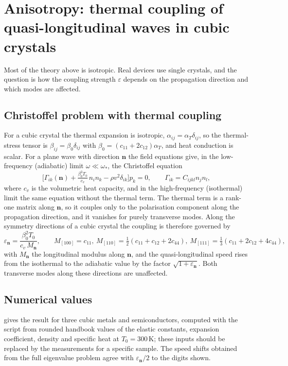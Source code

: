\section{Anisotropy: thermal coupling of quasi-longitudinal waves in cubic crystals}\label{sec:aniso}

Most of the theory above is isotropic. Real devices use single crystals, and the question is how the coupling strength $\varepsilon$ depends on the propagation direction and which modes are affected.

\subsection{Christoffel problem with thermal coupling}
For a cubic crystal the thermal expansion is isotropic, $\alpha_{ij}=\alpha_T\delta_{ij}$, so the thermal-stress tensor is $\beta_{ij}=\beta_0\delta_{ij}$ with $\beta_0=(c_{11}+2c_{12})\alpha_T$, and heat conduction is scalar. For a plane wave with direction $\bm n$ the field equations give, in the low-frequency (adiabatic) limit $\omega\ll\omega_*$, the Christoffel equation
\begin{equation}\label{eq:christ}
\bigl[\Gamma_{ik}(\bm n)+\tfrac{\beta_0^2T_0}{c_v}\,n_in_k-\rho v^2\delta_{ik}\bigr]p_k=0,\qquad \Gamma_{ik}=C_{ijkl}n_jn_l,
\end{equation}
where $c_v$ is the volumetric heat capacity, and in the high-frequency (isothermal) limit the same equation without the thermal term. The thermal term is a rank-one matrix along $\bm n$, so it couples only to the polarisation component along the propagation direction, and it vanishes for purely transverse modes. Along the symmetry directions of a cubic crystal the coupling is therefore governed by
\begin{equation}\label{eq:epsdir}
\varepsilon_{\bm n}=\frac{\beta_0^2T_0}{c_v\,M_{\bm n}},\qquad M_{[100]}=c_{11},\ M_{[110]}=\tfrac12(c_{11}+c_{12}+2c_{44}),\ M_{[111]}=\tfrac13(c_{11}+2c_{12}+4c_{44}),
\end{equation}
with $M_{\bm n}$ the longitudinal modulus along $\bm n$, and the quasi-longitudinal speed rises from the isothermal to the adiabatic value by the factor $\sqrt{1+\varepsilon_{\bm n}}$. Both transverse modes along these directions are unaffected.

\subsection{Numerical values}
 gives the result for three cubic metals and semiconductors, computed with the script  from rounded handbook values of the elastic constants, expansion coefficient, density and specific heat at $T_0=300$\,K; these inputs should be replaced by the measurements for a specific sample. The speed shifts obtained from the full eigenvalue problem agree with $\varepsilon_{\bm n}/2$ to the digits shown.

